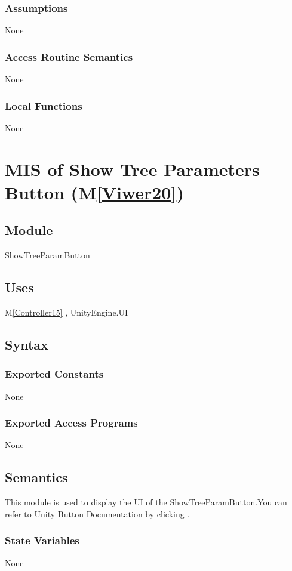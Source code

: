 \documentclass[12pt, titlepage]{article}
\newcommand{\mref}[1]{M\ref{#1}}
\begin{document}
\subsubsection{Assumptions}
None
\subsubsection{Access Routine Semantics}
None
\subsubsection{Local Functions}
None


\newpage

\section{MIS of Show Tree Parameters Button (\mref{Viwer20})}

\subsection{Module}
ShowTreeParamButton

\subsection{Uses}
\mref{Controller15}  , UnityEngine.UI

\subsection{Syntax}
\subsubsection{Exported Constants}
None
\subsubsection{Exported Access Programs}
None


\subsection{Semantics}
This module is used to display the UI of the 
ShowTreeParamButton.You can refer to Unity Button Documentation by
clicking \bref.

\subsubsection{State Variables}
None
\end{document}
